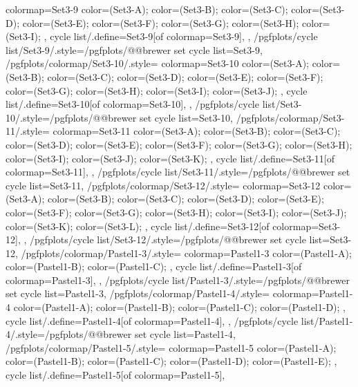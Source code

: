 {{    colormap={Set3-9}{
      color=(Set3-A);
      color=(Set3-B);
      color=(Set3-C);
      color=(Set3-D);
      color=(Set3-E);
      color=(Set3-F);
      color=(Set3-G);
      color=(Set3-H);
      color=(Set3-I);
    },
    cycle list/.define={Set3-9}{[of colormap=Set3-9]},
  },
  /pgfplots/cycle list/Set3-9/.style={/pgfplots/@@brewer set cycle list={Set3-9}},
  /pgfplots/colormap/Set3-10/.style={
    colormap={Set3-10}{
      color=(Set3-A);
      color=(Set3-B);
      color=(Set3-C);
      color=(Set3-D);
      color=(Set3-E);
      color=(Set3-F);
      color=(Set3-G);
      color=(Set3-H);
      color=(Set3-I);
      color=(Set3-J);
    },
    cycle list/.define={Set3-10}{[of colormap=Set3-10]},
  },
  /pgfplots/cycle list/Set3-10/.style={/pgfplots/@@brewer set cycle list={Set3-10}},
  /pgfplots/colormap/Set3-11/.style={
    colormap={Set3-11}{
      color=(Set3-A);
      color=(Set3-B);
      color=(Set3-C);
      color=(Set3-D);
      color=(Set3-E);
      color=(Set3-F);
      color=(Set3-G);
      color=(Set3-H);
      color=(Set3-I);
      color=(Set3-J);
      color=(Set3-K);
    },
    cycle list/.define={Set3-11}{[of colormap=Set3-11]},
  },
  /pgfplots/cycle list/Set3-11/.style={/pgfplots/@@brewer set cycle list={Set3-11}},
  /pgfplots/colormap/Set3-12/.style={
    colormap={Set3-12}{
      color=(Set3-A);
      color=(Set3-B);
      color=(Set3-C);
      color=(Set3-D);
      color=(Set3-E);
      color=(Set3-F);
      color=(Set3-G);
      color=(Set3-H);
      color=(Set3-I);
      color=(Set3-J);
      color=(Set3-K);
      color=(Set3-L);
    },
    cycle list/.define={Set3-12}{[of colormap=Set3-12]},
  },
  /pgfplots/cycle list/Set3-12/.style={/pgfplots/@@brewer set cycle list={Set3-12}},
  /pgfplots/colormap/Pastel1-3/.style={
    colormap={Pastel1-3}{
      color=(Pastel1-A);
      color=(Pastel1-B);
      color=(Pastel1-C);
    },
    cycle list/.define={Pastel1-3}{[of colormap=Pastel1-3]},
  },
  /pgfplots/cycle list/Pastel1-3/.style={/pgfplots/@@brewer set cycle list={Pastel1-3}},
  /pgfplots/colormap/Pastel1-4/.style={
    colormap={Pastel1-4}{
      color=(Pastel1-A);
      color=(Pastel1-B);
      color=(Pastel1-C);
      color=(Pastel1-D);
    },
    cycle list/.define={Pastel1-4}{[of colormap=Pastel1-4]},
  },
  /pgfplots/cycle list/Pastel1-4/.style={/pgfplots/@@brewer set cycle list={Pastel1-4}},
  /pgfplots/colormap/Pastel1-5/.style={
    colormap={Pastel1-5}{
      color=(Pastel1-A);
      color=(Pastel1-B);
      color=(Pastel1-C);
      color=(Pastel1-D);
      color=(Pastel1-E);
    },
    cycle list/.define={Pastel1-5}{[of colormap=Pastel1-5]},
}}
